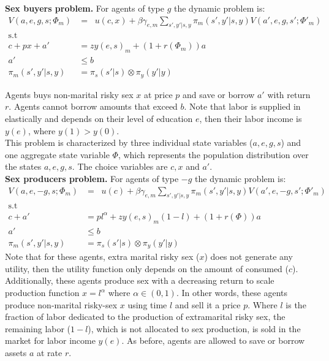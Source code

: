 \noindent \textbf{Sex buyers problem.} For agents of type $g$ the dynamic problem is:
\begin{align}
V(a,e,g,s;\Phi_m) &= \mathop{\max_{c\geq 0,x \geq 0,a' \geq 0}}  u(c,x) + \beta \gamma_{e,m} \sum_{s',y'|s,y}\pi_m(s',y'|s,y)  V(a',e,g,s';\Phi'_m) \label{eq1}\\
\mbox{s.t}\nonumber\\
c+ px +a'&= zy(e,s)_m + (1+r(\Phi_m))a \label{eq2}\\
a' &\leq b \\
\pi_m(s',y'|s,y) & = \pi_{s}(s'|s) \otimes\pi_{y}(y'|y) 
\end{align}



 Agents buys non-marital risky sex $x$ at price $p$ and save or borrow $a'$ with return $r$. Agents cannot borrow amounts that exceed $b$. Note that labor is supplied in elastically and depends on their level of education $e$, then their labor income is $y(e)$, where $y(1)>y(0)$.\\
 This problem is characterized by three individual state variables ($a,e,g,s$) and one aggregate state variable $\Phi$, which represents the population distribution over the states $a,e,g,s$. The choice variables are $c,x$ and $a'$.\\


\noindent \textbf{Sex producers problem.} For agents of type $-g$ the dynamic problem is:
\begin{align}
V(a,e,-g,s;\Phi_m) &= \mathop{\max_{c\geq 0, 1\geq l\geq 0,a' \geq 0}}  u(c) + \beta \gamma_{e,m}  \sum_{s',y'|s,y}\pi_m(s',y'|s,y) V(a',e,-g,s';\Phi'_m) \label{eq3}\\
\mbox{s.t}\nonumber\\
c +a'&= pl^{\alpha}+zy(e,s)_m(1-l) + (1+r(\Phi))a \label{eq4}\\
a' &\leq b \\
\pi_m(s',y'|s,y) & = \pi_{s}(s'|s) \otimes\pi_{y}(y'|y) 
\end{align}
Note that for these agents, extra marital risky sex ($x$) does not generate any utility, then the utility function only depends on the amount of consumed ($c$). Additionally, these agents produce sex with a decreasing return to scale production function $x=l^{\alpha}$ where $\alpha\in(0,1)$. In other words, these agents produce non-marital risky-sex $x$ using time $l$ and sell it a price $p$. Where $l$ is the fraction of labor dedicated to the production of extramarital risky sex, the remaining labor ($1-l$), which is not allocated to sex production, is sold in the market for labor income $y(e)$. As before, agents are allowed to save or borrow assets $a$ at rate $r$.\\



